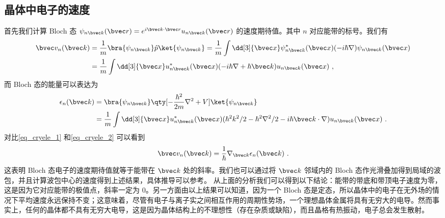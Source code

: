 \subsection{晶体中电子的速度}
首先我们计算 Bloch 态 $\psi_{n\bvec k}(\bvec r)=e^{i\bvec k\cdot \bvec r}u_{n\bvec k}(\bvec r)$ 的速度期待值。其中 $n$ 对应能带的标号。我们有
\begin{equation}\label{eq_cryele_1}
\begin{aligned}
\bvec v_n(\bvec k)&=\frac{1}{m}\bra{\psi_{n\bvec k}}\hat p\ket{\psi_{n\bvec k}}=\frac{1}{m}\int \dd[3]{\bvec x}\psi_{n\bvec k}^*(\bvec x)(-i\hbar\nabla)\psi_{n\bvec k}(\bvec x)\\
&=\frac{1}{m}\int \dd[3]{\bvec x}u_{n\bvec k}^*(\bvec x)(-i\hbar\nabla+\hbar \bvec k)u_{n\bvec k}(\bvec x)~,
\end{aligned}
\end{equation}
而 Bloch 态的能量可以表达为
\begin{equation}\label{eq_cryele_2}
\begin{aligned}
\epsilon_{n}(\bvec k)&=\bra{\psi_{n\bvec k}} \qty[-\frac{\hbar^2}{2m}\nabla^2+V]\ket{\psi_{n\bvec k}}
\\&=\frac{1}{m}\int \dd[3]{\bvec x} u_{n\bvec k}^*(\bvec x)(\hbar^2k^2/2-\hbar^2\nabla^2/2-i\hbar\bvec k\cdot \nabla)u_{n\bvec k}(\bvec x)~.
\end{aligned}
\end{equation}
对比\autoref{eq_cryele_1} 和\autoref{eq_cryele_2} 可以看到
\begin{equation}\label{eq_cryele_3}
\bvec v_n(\bvec k)=\frac{1}{\hbar}\nabla_{\bvec k}\epsilon_{n}(\bvec k)~.
\end{equation}
这表明 Bloch 态电子的速度期待值就等于能带在 $\bvec k$ 处的斜率。我们也可以通过将 $\bvec k$ 邻域内的 Bloch 态作光滑叠加得到局域的波包，并且计算波包中心的速度得到上述结果，具体推导可以参考。 从上面的分析我们可以得到以下结论：能带的带底和带顶电子速度为零，这是因为它对应能带的极值点，斜率一定为 $0$。另一方面由以上结果可以知道，因为一个 Bloch 态是定态，所以晶体中的电子在无外场的情况下平均速度永远保持不变；这意味着，尽管有电子与离子实之间相互作用的周期性势场，一个理想晶体金属将具有无穷大的电导。然而事实上，任何的晶体都不具有无穷大电导，这是因为晶体结构上的不理想性（存在杂质或缺陷），而且晶格有热振动，电子总会发生散射。
